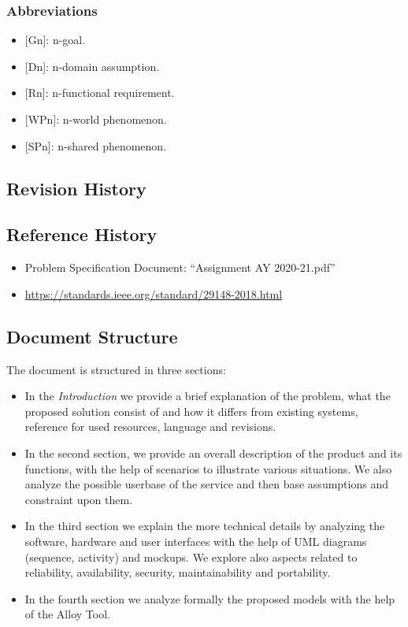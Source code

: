 \subsubsection{Abbreviations}
\begin{itemize}
    \item {[Gn]}: n-goal.
    \item {[Dn]}: n-domain assumption.
    \item {[Rn]}: n-functional requirement.
    \item {[WPn]}: n-world phenomenon.
    \item {[SPn]}: n-shared phenomenon.
\end{itemize}

\subsection{Revision History}
\subsection{Reference History}
\begin{itemize}
    \item Problem Specification Document: ``Assignment AY 2020-21.pdf''
    \item \url{https://standards.ieee.org/standard/29148-2018.html}
\end{itemize}
\subsection{Document Structure}

The document is structured in three sections:

\begin{itemize}
    \item In the \emph{Introduction} we provide a brief explanation of the problem, what the proposed solution consist of and how it differs from existing systems, reference for used resources, language and revisions.
    \item In the second section, we provide an overall description of the product and its functions, with the help
    of scenarios to illustrate various situations. We also analyze the possible userbase of the service and then base
    assumptions and constraint upon them.
    \item In the third section we explain the more technical details by analyzing the software, hardware and user interfaces
    with the help of UML diagrams (sequence, activity) and mockups.
    We explore also aspects related to reliability, availability, security, maintainability and portability.
    \item In the fourth section we analyze formally the proposed models with the help of the Alloy Tool.
\end{itemize}
